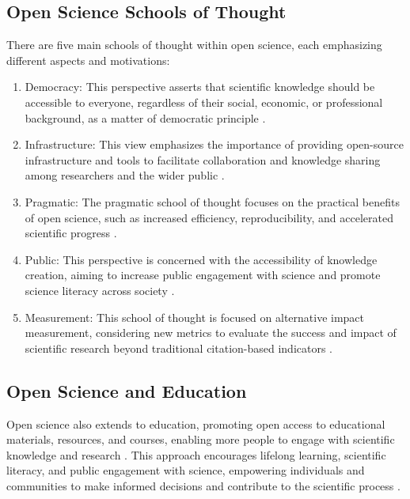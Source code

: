 \documentclass{IEEEtran}
\begin{document}
\subsection{Open Science Schools of Thought}
There are five main schools of thought within open science, each emphasizing different aspects and motivations:

\begin{enumerate}
\item Democracy: This perspective asserts that scientific knowledge should be accessible to everyone, regardless of their social, economic, or professional background, as a matter of democratic principle \cite{fecher2014openscience}.

\item Infrastructure: This view emphasizes the importance of providing open-source infrastructure and tools to facilitate collaboration and knowledge sharing among researchers and the wider public \cite{fecher2014openscience}.

\item Pragmatic: The pragmatic school of thought focuses on the practical benefits of open science, such as increased efficiency, reproducibility, and accelerated scientific progress \cite{fecher2014openscience}.

\item Public: This perspective is concerned with the accessibility of knowledge creation, aiming to increase public engagement with science and promote science literacy across society \cite{fecher2014openscience}.

\item Measurement: This school of thought is focused on alternative impact measurement, considering new metrics to evaluate the success and impact of scientific research beyond traditional citation-based indicators \cite{fecher2014openscience}.

\end{enumerate}

\subsection{Open Science and Education}
Open science also extends to education, promoting open access to educational materials, resources, and courses, enabling more people to engage with scientific knowledge and research \cite{wiley2014open}. This approach encourages lifelong learning, scientific literacy, and public engagement with science, empowering individuals and communities to make informed decisions and contribute to the scientific process \cite{fecher2014openscience}.
\end{document}
